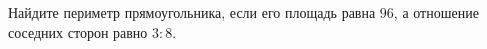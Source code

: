 \begin{ex}
	\begin{condition}
		Найдите периметр прямоугольника, если его площадь равна \( 96 \), а отношение соседних сторон равно \( 3:8 \).
	\end{condition}
\end{ex}
